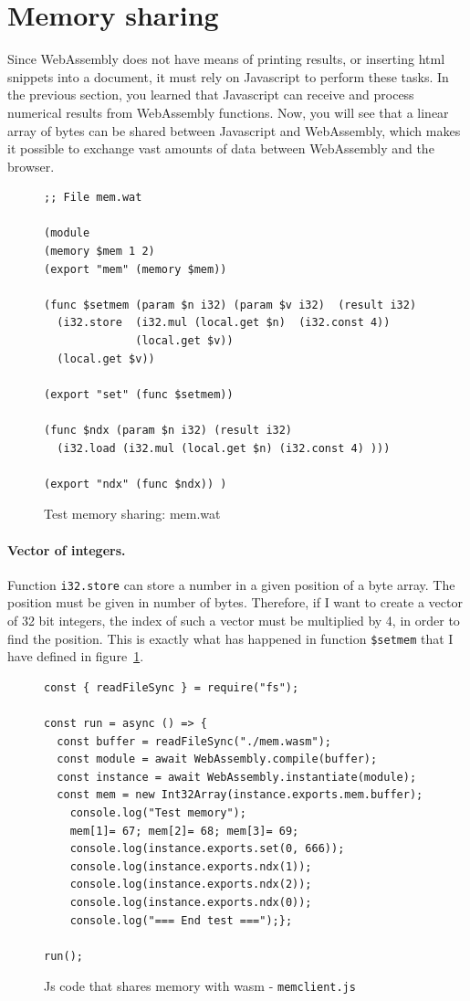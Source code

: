 \documentclass[a4paper,12pt]{book}
\begin{document}
\section{Memory sharing}
Since WebAssembly does not have means of printing results,
or inserting html snippets into a document, it must rely
on Javascript to perform these tasks. In the previous section,
you learned that Javascript can receive and process
numerical results from WebAssembly functions. Now, you will
see that a linear array of bytes can be shared between
Javascript and WebAssembly, which makes it possible
to exchange vast amounts of data between WebAssembly
and the browser.

\begin{figure}[!h]
\begin{verbatim}
;; File mem.wat

(module
(memory $mem 1 2)
(export "mem" (memory $mem))

(func $setmem (param $n i32) (param $v i32)  (result i32)
  (i32.store  (i32.mul (local.get $n)  (i32.const 4))
              (local.get $v))
  (local.get $v))
  
(export "set" (func $setmem))

(func $ndx (param $n i32) (result i32)
  (i32.load (i32.mul (local.get $n) (i32.const 4) )))
  
(export "ndx" (func $ndx)) )
\end{verbatim}
  \caption{Test memory sharing: mem.wat}
  \label{wasm:memsharing}
\end{figure}

\paragraph{Vector of integers.} Function \verb|i32.store|
can store a number in a
given position of a byte array. The position must
be given in number of bytes. Therefore, if I want
to create a vector of 32 bit integers, the index
of such a vector must be multiplied by 4, in order
to find the position. This is exactly what has happened
in function \verb|$setmem| that I have defined
in figure~\ref{wasm:memsharing}.

\begin{figure}[h!]
\begin{verbatim}
const { readFileSync } = require("fs");

const run = async () => {
  const buffer = readFileSync("./mem.wasm");
  const module = await WebAssembly.compile(buffer);
  const instance = await WebAssembly.instantiate(module);
  const mem = new Int32Array(instance.exports.mem.buffer);
    console.log("Test memory");
    mem[1]= 67; mem[2]= 68; mem[3]= 69;
    console.log(instance.exports.set(0, 666));
    console.log(instance.exports.ndx(1));
    console.log(instance.exports.ndx(2));
    console.log(instance.exports.ndx(0));
    console.log("=== End test ===");};

run();
\end{verbatim}
  \caption{Js code that shares memory
              with wasm - {\tt memclient.js}}
\end{figure}
\end{document}
